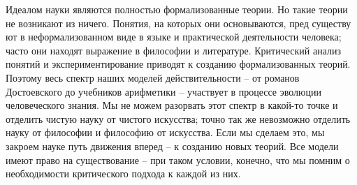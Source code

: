 \documentclass{book}
\begin{document}
Идеалом науки являются полностью формализованные теории. Но такие теории не возникают из ничего. Понятия, на которых они основываются, пред существу ют в неформализованном виде в языке и практической деятельности человека; часто они находят выражение в философии и литературе. Критический анализ понятий и экспериментирование приводят к со­зданию формализованных теорий. Поэтому весь спектр наших моделей действительности -- от романов Достоевского до учебников арифметики -- участвует в процессе эволюции человече­ского знания. Мы не можем разорвать этот спектр в какой-то точке и отделить чистую науку от чистого искусства; точно так же невозможно отделить науку от философии и философию от искусства. Если мы сделаем это, мы закроем науке путь движения вперед -- к созданию новых теорий. Все модели имеют право на существование -- при таком условии, конечно, что мы помним о необходимости критического подхода к каждой из них.
\end{document}

